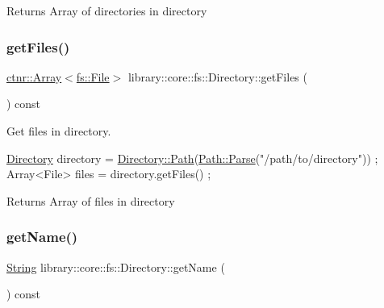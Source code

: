 \begin{DoxyReturn}{Returns}
Array of directories in directory 
\end{DoxyReturn}
\mbox{\label{classlibrary_1_1core_1_1fs_1_1_directory_a9c80c3a09389bb6f024e9a9001dea432}} 
\subsubsection{\texorpdfstring{get\+Files()}{getFiles()}}
{\footnotesize\ttfamily \hyperlink{classlibrary_1_1core_1_1ctnr_1_1_array}{ctnr\+::\+Array}$<$\hyperlink{classlibrary_1_1core_1_1fs_1_1_file}{fs\+::\+File}$>$ library\+::core\+::fs\+::\+Directory\+::get\+Files (\begin{DoxyParamCaption}{ }\end{DoxyParamCaption}) const}



Get files in directory. 


\begin{DoxyCode}
\hyperlink{classlibrary_1_1core_1_1fs_1_1_directory_a3ec39f6cad19a81d520e9a1f2d8bb1f7}{Directory} directory = \hyperlink{classlibrary_1_1core_1_1fs_1_1_directory_ae906e33e4659219cf296dd314c7726b8}{Directory::Path}(\hyperlink{classlibrary_1_1core_1_1fs_1_1_path_a6ba644b6609507e724c217bf2020f5ae}{Path::Parse}(\textcolor{stringliteral}{"/path/to/directory"}))
       ;
Array<File> files = directory.getFiles() ;
\end{DoxyCode}


\begin{DoxyReturn}{Returns}
Array of files in directory 
\end{DoxyReturn}
\mbox{\label{classlibrary_1_1core_1_1fs_1_1_directory_a7c21b35bbdc6306d9b98cdd220515619}} 
\subsubsection{\texorpdfstring{get\+Name()}{getName()}}
{\footnotesize\ttfamily \hyperlink{classlibrary_1_1core_1_1types_1_1_string}{String} library\+::core\+::fs\+::\+Directory\+::get\+Name (\begin{DoxyParamCaption}{ }\end{DoxyParamCaption}) const}



